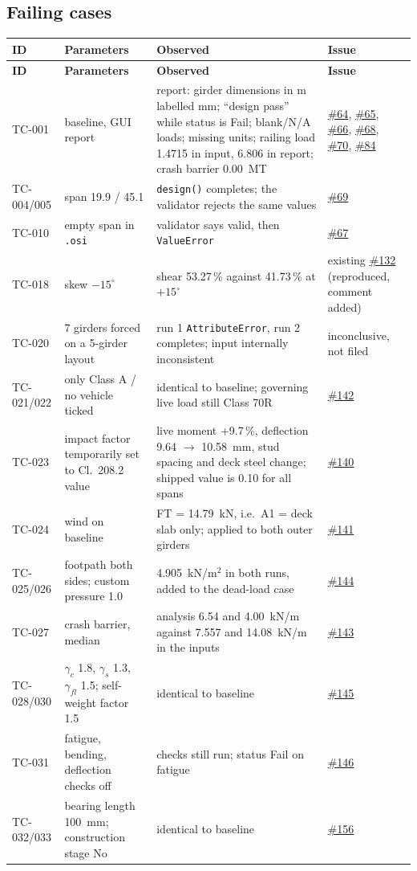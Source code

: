 \documentclass[10pt,a4paper]{article}
\newcommand{\gh}[1]{\href{https://github.com/Nidhikhare12/OsdagBridge/issues/#1}{\##1}}
\newcommand{\issPF}{\gh{145}}   %
\newcommand{\issCS}{\gh{146}}   %
\newcommand{\issBL}{\gh{156}}   %
\begin{document}
\subsection{Failing cases}
\begin{longtable}{@{}L{1.25cm}L{3.8cm}L{7.3cm}L{4.1cm}@{}}
\toprule
\textbf{ID} & \textbf{Parameters} & \textbf{Observed} & \textbf{Issue}\\
\midrule\endfirsthead
\toprule \textbf{ID} & \textbf{Parameters} & \textbf{Observed} & \textbf{Issue}\\ \midrule\endhead
TC-001 & baseline, GUI report & report: girder dimensions in m labelled mm; ``design pass'' while status is Fail; blank/N/A loads; missing units; railing load 1.4715 in input, 6.806 in report; crash barrier 0.00~MT & \gh{64}, \gh{65}, \gh{66}, \gh{68}, \gh{70}, \gh{84}\\
TC-004/005 & span 19.9 / 45.1 & \texttt{design()} completes; the validator rejects the same values & \gh{69}\\
TC-010 & empty span in \texttt{.osi} & validator says valid, then \texttt{ValueError} & \gh{67}\\
TC-018 & skew $-15^{\circ}$ & shear 53.27\,\% against 41.73\,\% at $+15^{\circ}$ & existing \gh{132} (reproduced, comment added)\\
TC-020 & 7 girders forced on a 5-girder layout & run 1 \texttt{AttributeError}, run 2 completes; input internally inconsistent & inconclusive, not filed\\
TC-021/022 & only Class A / no vehicle ticked & identical to baseline; governing live load still Class 70R & \gh{142}\\
TC-023 & impact factor temporarily set to Cl.~208.2 value & live moment +9.7\,\%, deflection 9.64 $\rightarrow$ 10.58~mm, stud spacing and deck steel change; shipped value is 0.10 for all spans & \gh{140}\\
TC-024 & wind on baseline & FT = 14.79~kN, i.e.\ A1 = deck slab only; applied to both outer girders & \gh{141}\\
TC-025/026 & footpath both sides; custom pressure 1.0 & 4.905~kN/m$^2$ in both runs, added to the dead-load case & \gh{144}\\
TC-027 & crash barrier, median & analysis 6.54 and 4.00~kN/m against 7.557 and 14.08~kN/m in the inputs & \gh{143}\\
TC-028/030 & $\gamma_c$ 1.8, $\gamma_s$ 1.3, $\gamma_{fl}$ 1.5; self-weight factor 1.5 & identical to baseline & \issPF\\
TC-031 & fatigue, bending, deflection checks off & checks still run; status Fail on fatigue & \issCS\\
TC-032/033 & bearing length 100~mm; construction stage No & identical to baseline & \issBL\\
\bottomrule
\end{longtable}
\end{document}
